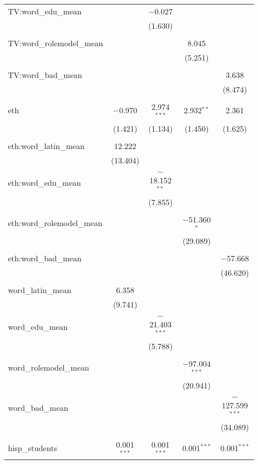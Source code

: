 \begin{table}[!htbp]
\begin{tabular}{@{\extracolsep{-2pt}}lcccc}
 TV:word\_edu\_mean &  & $-$0.027 &  &  \\ 
  &  & (1.630) &  &  \\ 
  & & & & \\ 
 TV:word\_rolemodel\_mean &  &  & 8.045 &  \\ 
  &  &  & (5.251) &  \\ 
  & & & & \\ 
 TV:word\_bad\_mean &  &  &  & 3.638 \\ 
  &  &  &  & (8.474) \\ 
  & & & & \\ 
 eth & $-$0.970 & 2.974$^{***}$ & 2.932$^{**}$ & 2.361 \\ 
  & (1.421) & (1.134) & (1.450) & (1.625) \\ 
  & & & & \\ 
 eth:word\_latin\_mean & 12.222 &  &  &  \\ 
  & (13.404) &  &  &  \\ 
  & & & & \\ 
 eth:word\_edu\_mean &  & $-$18.152$^{**}$ &  &  \\ 
  &  & (7.855) &  &  \\ 
  & & & & \\ 
 eth:word\_rolemodel\_mean &  &  & $-$51.360$^{*}$ &  \\ 
  &  &  & (29.089) &  \\ 
  & & & & \\ 
 eth:word\_bad\_mean &  &  &  & $-$57.668 \\ 
  &  &  &  & (46.620) \\ 
  & & & & \\ 
 word\_latin\_mean & 6.358 &  &  &  \\ 
  & (9.741) &  &  &  \\ 
  & & & & \\ 
 word\_edu\_mean &  & $-$21.403$^{***}$ &  &  \\ 
  &  & (5.788) &  &  \\ 
  & & & & \\ 
 word\_rolemodel\_mean &  &  & $-$97.004$^{***}$ &  \\ 
  &  &  & (20.941) &  \\ 
  & & & & \\ 
 word\_bad\_mean &  &  &  & $-$127.599$^{***}$ \\ 
  &  &  &  & (34.089) \\ 
  & & & & \\ 
 hisp\_students & 0.001$^{***}$ & 0.001$^{***}$ & 0.001$^{***}$ & 0.001$^{***}$ \\ 

\end{tabular}
\end{table}
